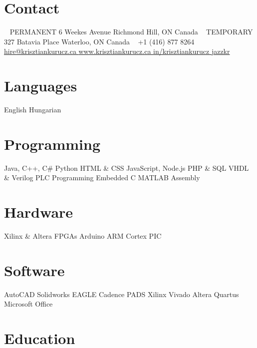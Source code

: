 \documentclass[hidelinks]{kkurucz-cv}
\begin{document}


\begin{aside} %
\section{Contact}
~
{\headingfont PERMANENT}
6 Weekes Avenue
Richmond Hill, ON
Canada
~
{\headingfont TEMPORARY}
327 Batavia Place
Waterloo, ON
Canada
~
{+1 (416) 877 8264\hspace{1.5mm}\mobile}
~
\href{mailto:hire@krisztiankurucz.ca}{hire@krisztiankurucz.ca }\mail
\href{http://www.krisztiankurucz.ca}{www.krisztiankurucz.ca }\website
\href{http://ca.linkedin.com/in/krisztiankurucz}{in/krisztiankurucz }\linkedin
\href{http://www.github.com/jazzkr}{jazzkr }\github
\section{Languages}
English
Hungarian
\section{Programming}
Java, C++, C\#
Python
HTML \& CSS
JavaScript, Node.js
PHP \& SQL
VHDL \& Verilog
PLC Programming
Embedded C
MATLAB
Assembly
\section{Hardware}
Xilinx \& Altera FPGAs
Arduino
ARM Cortex
PIC
\section{Software}
AutoCAD
Solidworks
EAGLE
Cadence
PADS
Xilinx Vivado
Altera Quartus
Microsoft Office
\end{aside}


\vspace{-2mm}
\section{Education}
\end{document}
